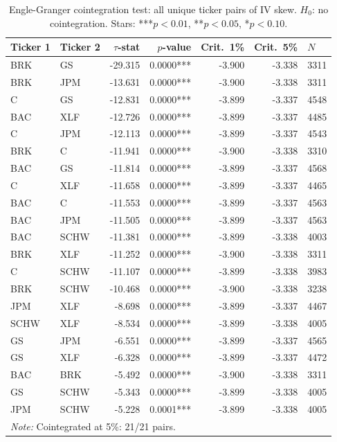 \begin{table}[htbp]
\centering
\small
\caption{Engle-Granger cointegration test: all unique ticker pairs of IV skew. $H_0$: no cointegration. Stars: ***$p<0.01$, **$p<0.05$, *$p<0.10$.}
\label{tab:coint_pairs_engle_granger}
\begin{tabular}{llrrrrl}
\toprule
Ticker 1 & Ticker 2 & $\tau$-stat & $p$-value & Crit.\ 1\% & Crit.\ 5\% & $N$ \\
\midrule
BRK & GS & -29.315 & 0.0000*** & -3.900 & -3.338 & 3311 \\
BRK & JPM & -13.631 & 0.0000*** & -3.900 & -3.338 & 3311 \\
C & GS & -12.831 & 0.0000*** & -3.899 & -3.337 & 4548 \\
BAC & XLF & -12.726 & 0.0000*** & -3.899 & -3.337 & 4485 \\
C & JPM & -12.113 & 0.0000*** & -3.899 & -3.337 & 4543 \\
BRK & C & -11.941 & 0.0000*** & -3.900 & -3.338 & 3310 \\
BAC & GS & -11.814 & 0.0000*** & -3.899 & -3.337 & 4568 \\
C & XLF & -11.658 & 0.0000*** & -3.899 & -3.337 & 4465 \\
BAC & C & -11.553 & 0.0000*** & -3.899 & -3.337 & 4563 \\
BAC & JPM & -11.505 & 0.0000*** & -3.899 & -3.337 & 4563 \\
BAC & SCHW & -11.381 & 0.0000*** & -3.899 & -3.338 & 4003 \\
BRK & XLF & -11.252 & 0.0000*** & -3.900 & -3.338 & 3311 \\
C & SCHW & -11.107 & 0.0000*** & -3.899 & -3.338 & 3983 \\
BRK & SCHW & -10.468 & 0.0000*** & -3.900 & -3.338 & 3238 \\
JPM & XLF & -8.698 & 0.0000*** & -3.899 & -3.337 & 4467 \\
SCHW & XLF & -8.534 & 0.0000*** & -3.899 & -3.338 & 4005 \\
GS & JPM & -6.551 & 0.0000*** & -3.899 & -3.337 & 4565 \\
GS & XLF & -6.328 & 0.0000*** & -3.899 & -3.337 & 4472 \\
BAC & BRK & -5.492 & 0.0000*** & -3.900 & -3.338 & 3311 \\
GS & SCHW & -5.343 & 0.0000*** & -3.899 & -3.338 & 4005 \\
JPM & SCHW & -5.228 & 0.0001*** & -3.899 & -3.338 & 4005 \\
\bottomrule
\multicolumn{7}{l}{\textit{Note: } Cointegrated at 5\%: 21/21 pairs.} \\
\end{tabular}
\end{table}